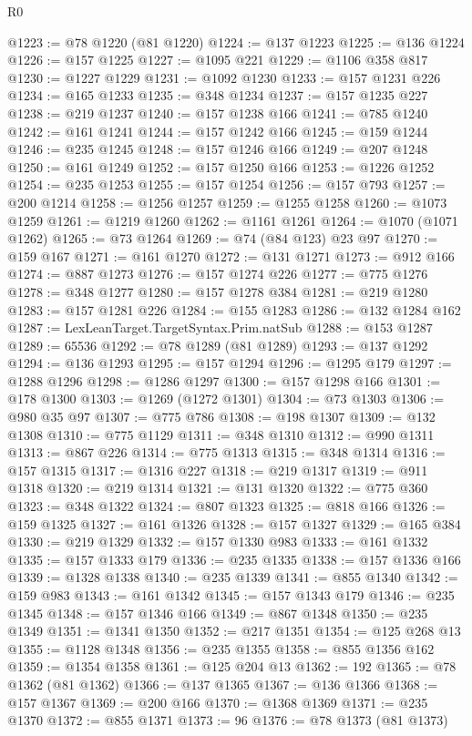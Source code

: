 \begin{lexlean}{R0}
\begin{coremodule}
@1223 := @78 @1220 (@81 @1220)
@1224 := @137 @1223
@1225 := @136 @1224
@1226 := @157 @1225
@1227 := @1095 @221
@1229 := @1106 @358 @817
@1230 := @1227 @1229
@1231 := @1092 @1230
@1233 := @157 @1231 @226
@1234 := @165 @1233
@1235 := @348 @1234
@1237 := @157 @1235 @227
@1238 := @219 @1237
@1240 := @157 @1238 @166
@1241 := @785 @1240
@1242 := @161 @1241
@1244 := @157 @1242 @166
@1245 := @159 @1244
@1246 := @235 @1245
@1248 := @157 @1246 @166
@1249 := @207 @1248
@1250 := @161 @1249
@1252 := @157 @1250 @166
@1253 := @1226 @1252
@1254 := @235 @1253
@1255 := @157 @1254
@1256 := @157 @793
@1257 := @200 @1214
@1258 := @1256 @1257
@1259 := @1255 @1258
@1260 := @1073 @1259
@1261 := @1219 @1260
@1262 := @1161 @1261
@1264 := @1070 (@1071 @1262)
@1265 := @73 @1264
@1269 := @74 (@84 @123) @23 @97
@1270 := @159 @167
@1271 := @161 @1270
@1272 := @131 @1271
@1273 := @912 @166
@1274 := @887 @1273
@1276 := @157 @1274 @226
@1277 := @775 @1276
@1278 := @348 @1277
@1280 := @157 @1278 @384
@1281 := @219 @1280
@1283 := @157 @1281 @226
@1284 := @155 @1283
@1286 := @132 @1284 @162
@1287 := LexLeanTarget.TargetSyntax.Prim.natSub
@1288 := @153 @1287
@1289 := 65536
@1292 := @78 @1289 (@81 @1289)
@1293 := @137 @1292
@1294 := @136 @1293
@1295 := @157 @1294
@1296 := @1295 @179
@1297 := @1288 @1296
@1298 := @1286 @1297
@1300 := @157 @1298 @166
@1301 := @178 @1300
@1303 := @1269 (@1272 @1301)
@1304 := @73 @1303
@1306 := @980 @35 @97
@1307 := @775 @786
@1308 := @198 @1307
@1309 := @132 @1308
@1310 := @775 @1129
@1311 := @348 @1310
@1312 := @990 @1311
@1313 := @867 @226
@1314 := @775 @1313
@1315 := @348 @1314
@1316 := @157 @1315
@1317 := @1316 @227
@1318 := @219 @1317
@1319 := @911 @1318
@1320 := @219 @1314
@1321 := @131 @1320
@1322 := @775 @360
@1323 := @348 @1322
@1324 := @807 @1323
@1325 := @818 @166
@1326 := @159 @1325
@1327 := @161 @1326
@1328 := @157 @1327
@1329 := @165 @384
@1330 := @219 @1329
@1332 := @157 @1330 @983
@1333 := @161 @1332
@1335 := @157 @1333 @179
@1336 := @235 @1335
@1338 := @157 @1336 @166
@1339 := @1328 @1338
@1340 := @235 @1339
@1341 := @855 @1340
@1342 := @159 @983
@1343 := @161 @1342
@1345 := @157 @1343 @179
@1346 := @235 @1345
@1348 := @157 @1346 @166
@1349 := @867 @1348
@1350 := @235 @1349
@1351 := @1341 @1350
@1352 := @217 @1351
@1354 := @125 @268 @13
@1355 := @1128 @1348
@1356 := @235 @1355
@1358 := @855 @1356 @162
@1359 := @1354 @1358
@1361 := @125 @204 @13
@1362 := 192
@1365 := @78 @1362 (@81 @1362)
@1366 := @137 @1365
@1367 := @136 @1366
@1368 := @157 @1367
@1369 := @200 @166
@1370 := @1368 @1369
@1371 := @235 @1370
@1372 := @855 @1371
@1373 := 96
@1376 := @78 @1373 (@81 @1373)

\end{coremodule}
\end{lexlean}
